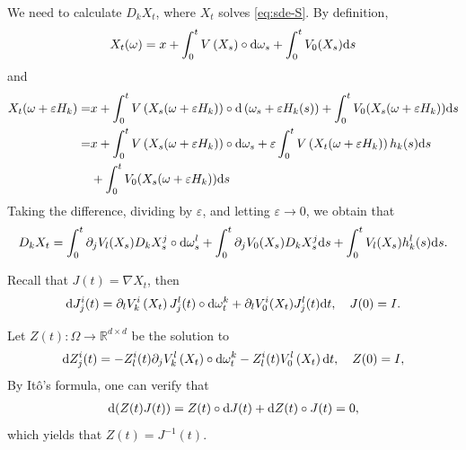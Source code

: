 \documentclass[twoside, 12pt]{book}
\numberwithin{equation}{chapter}
\def\p{\partial}
\def\d{\text{\rm{d}}}
\def\eps{\varepsilon}
\begin{document}
    We need to calculate $D_k X_t$, where $X_t$ solves \eqref{eq:sde-S}.  By definition, 
    \[
    X_t(\omega)=x+\int_0^t V \left(X_s\right) \circ \d \omega_s + \int_0^t V_0(X_s) \d s 
    \]
    and 
    \begin{equation*}
    	\begin{aligned}
    		X_t(\omega+\varepsilon H_k)=&x+\int_0^t V \left(X_s(\omega+\varepsilon H_k)\right) \circ \d\left(\omega_s+\varepsilon H_k(s)\right) +\int_0^t V_0(X_s(\omega+\eps H_k)) \d s\\
    		=&x+\int_0^t V\left(X_s(\omega+\varepsilon H_k)\right) \circ \d \omega_s +\varepsilon \int_0^t V\left(X_t(\omega+\varepsilon H_k)\right) h_k(s) \d s \\    		
    		&+\int_0^t V_0(X_s(\omega+\eps H_k)) \d s
    	\end{aligned}
    \end{equation*}
    Taking the difference, dividing by $\eps$, and letting $\eps\to0$, we obtain that
    \begin{equation}\label{eq:DkX}
    	D_k X_t =\int_0^t \partial_j V_l (X_s) D_kX^j_s\circ \d \omega_s^l +\int_0^t \partial_j V_0 (X_s) D_kX^j_s \d s  +   \int_0^t V_l (X_s)h_k^l(s)\d s. 
    \end{equation}
    
    Recall that $J(t)= \nabla X_t$, then 
    \begin{equation}\label{eq:Jacobi2}
        \d J^i_j(t)=\p_l V^i_k \left(X_t\right) J^l_j(t) \circ \d \omega^k_t + \p_l V^i_0(X_t) J^l_j(t)\d t, \quad J(0)=I .
    \end{equation}
   
   Let $Z(t): \Omega \rightarrow \mathbb{R}^{d \times d}$ be the solution to
   \begin{equation}\label{eq:Inv-J}
   	    \d Z^i_j(t)=-Z^i_l(t)  \p_j V^l_k  \left(X_t\right) \circ \d \omega^k_t-Z^i_l (t) V^l_0 \left(X_t\right) \d t, \quad Z(0)=I,
   \end{equation}
    By Itô's formula, one can verify that 
    \begin{equation*}
    	\begin{aligned}
    		\d (Z(t)J(t))= Z(t) \circ \d J(t)+\d Z(t) \circ J(t)=0, 
    	\end{aligned}
    \end{equation*}
    which yields that $Z(t)=J^{-1}(t)$. 
    
\end{document}
